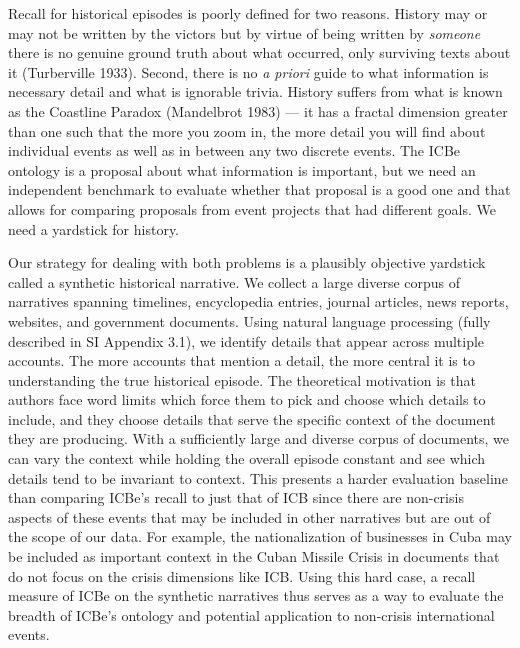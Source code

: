 \documentclass{article}
\begin{document}
Recall for historical episodes is poorly defined for two reasons.
History may or may not be written by the victors but by virtue of being
written by \emph{someone} there is no genuine ground truth about what
occurred, only surviving texts about it (Turberville 1933). Second,
there is no \emph{a priori} guide to what information is necessary
detail and what is ignorable trivia. History suffers from what is known
as the Coastline Paradox (Mandelbrot 1983) --- it has a fractal
dimension greater than one such that the more you zoom in, the more
detail you will find about individual events as well as in between any
two discrete events. The ICBe ontology is a proposal about what
information is important, but we need an independent benchmark to
evaluate whether that proposal is a good one and that allows for
comparing proposals from event projects that had different goals. We
need a yardstick for history.

Our strategy for dealing with both problems is a plausibly objective
yardstick called a synthetic historical narrative. We collect a large
diverse corpus of narratives spanning timelines, encyclopedia entries,
journal articles, news reports, websites, and government documents.
Using natural language processing (fully described in SI Appendix 3.1),
we identify details that appear across multiple accounts. The more
accounts that mention a detail, the more central it is to understanding
the true historical episode. The theoretical motivation is that authors
face word limits which force them to pick and choose which details to
include, and they choose details that serve the specific context of the
document they are producing. With a sufficiently large and diverse
corpus of documents, we can vary the context while holding the overall
episode constant and see which details tend to be invariant to context.
This presents a harder evaluation baseline than comparing ICBe's recall
to just that of ICB since there are non-crisis aspects of these events
that may be included in other narratives but are out of the scope of our
data. For example, the nationalization of businesses in Cuba may be
included as important context in the Cuban Missile Crisis in documents
that do not focus on the crisis dimensions like ICB. Using this hard
case, a recall measure of ICBe on the synthetic narratives thus serves
as a way to evaluate the breadth of ICBe's ontology and potential
application to non-crisis international events.
\end{document}
